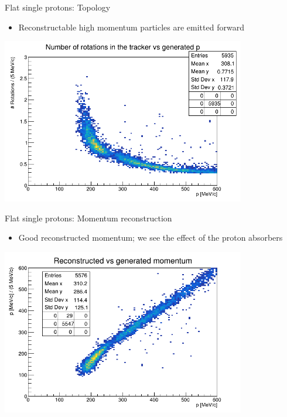 \documentclass[10pt]{beamer}
\begin{document}
%
\begin{frame}{Flat single protons: Topology}
\begin{itemize}
\item Reconstructable high momentum particles are emitted forward
\end{itemize}
\begin{center}
\includegraphics[width=0.8\textwidth]{plots/flat/Lambda_Rot-vs-p}
\end{center}
\end{frame}

%
\begin{frame}{Flat single protons: Momentum reconstruction}
\begin{itemize}
\item Good reconstructed momentum; we see the effect of the proton absorbers
\end{itemize}
\begin{center}
\includegraphics[width=0.8\textwidth]{plots/flat/Lambda_preco-vs-pgen}
\end{center}
\end{frame}
\end{document}
